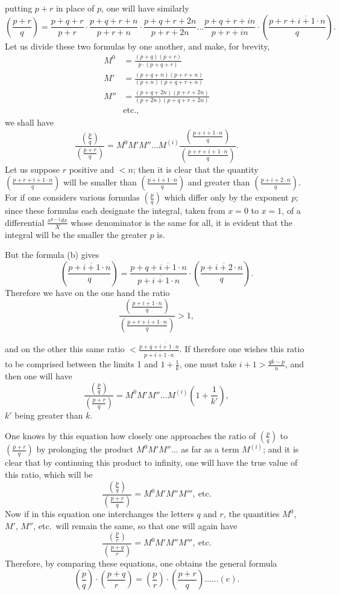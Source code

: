 \documentclass{article}
\begin{document}
putting $p+r$ in place of $p$, one will have similarly
\[ \left(\frac{p+r}{q}\right)=\frac{p+q+r}{p+r}\cdot\frac{p+q+r+n}{p+r+n}\cdot\frac{p+q+r+2n}{p+r+2n}\ldots\frac{p+q+r+in}{p+r+in}\cdot\left(\frac{p+r+\overline{i+1}\cdot n}{q}\right). \]
Let us divide these two formulas by one another, and make, for brevity,
\[ \begin{aligned} M^{0}&=\frac{(p+q)(p+r)}{p\cdot(p+q+r)}\\ M'&=\frac{(p+q+n)(p+r+n)}{(p+n)(p+q+r+n)}\\ M''&=\frac{(p+q+2n)(p+r+2n)}{(p+2n)(p+q+r+2n)}\\ &\text{etc.}, \end{aligned} \]
we shall have
\[ \frac{\left(\frac{p}{q}\right)}{\left(\frac{p+r}{q}\right)}=M^{0}M'M''\ldots M^{(i)}\frac{\left(\frac{p+\overline{i+1}\cdot n}{q}\right)}{\left(\frac{p+r+\overline{i+1}\cdot n}{q}\right)}. \]
Let us suppose $r$ positive and $<n$; then it is clear that the quantity $\left(\frac{p+r+\overline{i+1}\cdot n}{q}\right)$ will be smaller than $\left(\frac{p+\overline{i+1}\cdot n}{q}\right)$ and greater than $\left(\frac{p+\overline{i+2}\cdot n}{q}\right)$. For if one considers various formulas $\left(\frac{p}{q}\right)$ which differ only by the exponent $p$; since these formulas each designate the integral, taken from $x=0$ to $x=1$, of a differential $\frac{x^{p-1}dx}{X}$ whose denominator is the same for all, it is evident that the integral will be the smaller the greater $p$ is.

But the formula (b) gives
\[ \left(\frac{p+\overline{i+1}\cdot n}{q}\right)=\frac{p+q+\overline{i+1}\cdot n}{p+\overline{i+1}\cdot n}\cdot\left(\frac{p+\overline{i+2}\cdot n}{q}\right). \]
Therefore we have on the one hand the ratio
\[ \frac{\left(\frac{p+\overline{i+1}\cdot n}{q}\right)}{\left(\frac{p+r+\overline{i+1}\cdot n}{q}\right)}>1, \]

and on the other this same ratio $<\frac{p+q+\overline{i+1}\cdot n}{p+\overline{i+1}\cdot n}$. If therefore one wishes this ratio to be comprised between the limits 1 and $1+\frac{1}{k}$, one must take $i+1>\frac{qk-p}{n}$, and then one will have
\[ \frac{\left(\frac{p}{q}\right)}{\left(\frac{p+r}{q}\right)}=M^{0}M'M''\ldots M^{(i)}\left(1+\frac{1}{k'}\right), \]
$k'$ being greater than $k$.

One knows by this equation how closely one approaches the ratio of $\left(\frac{p}{q}\right)$ to $\left(\frac{p+r}{q}\right)$ by prolonging the product $M^{0}M'M''\ldots$ as far as a term $M^{(i)}$; and it is clear that by continuing this product to infinity, one will have the true value of this ratio, which will be
\[ \frac{\left(\frac{p}{q}\right)}{\left(\frac{p+r}{q}\right)}=M^{0}M'M''M''',\ \text{etc.} \]
Now if in this equation one interchanges the letters $q$ and $r$, the quantities $M^{0}$, $M'$, $M''$, etc.\ will remain the same, so that one will again have
\[ \frac{\left(\frac{p}{r}\right)}{\left(\frac{p+q}{r}\right)}=M^{0}M'M''M''',\ \text{etc.} \]
Therefore, by comparing these equations, one obtains the general formula
\[ \left(\frac{p}{q}\right)\cdot\left(\frac{p+q}{r}\right)=\left(\frac{p}{r}\right)\cdot\left(\frac{p+r}{q}\right)\ldots\ldots(e). \]
\end{document}
